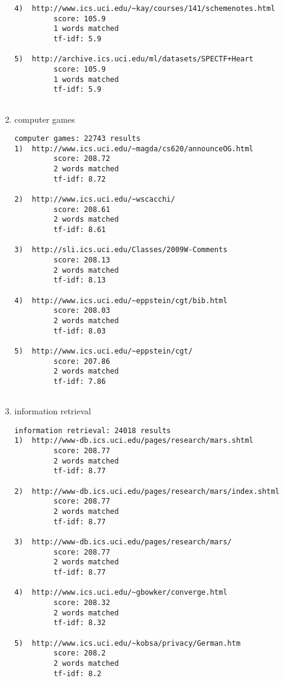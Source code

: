 \documentclass[paper=a4, fontsize=11pt]{scrartcl} %
\numberwithin{equation}{section} %
\numberwithin{table}{section} %
\begin{document}
\begin{enumerate}
\begin{small}
\begin{verbatim}
4)  http://www.ics.uci.edu/~kay/courses/141/schemenotes.html 
         score: 105.9 
         1 words matched 
         tf-idf: 5.9

5)  http://archive.ics.uci.edu/ml/datasets/SPECTF+Heart 
         score: 105.9 
         1 words matched 
         tf-idf: 5.9


\end{verbatim}
\end{small}

\item computer games
\begin{small}
\begin{verbatim}
computer games: 22743 results
1)  http://www.ics.uci.edu/~magda/cs620/announceOG.html 
         score: 208.72 
         2 words matched 
         tf-idf: 8.72

2)  http://www.ics.uci.edu/~wscacchi/ 
         score: 208.61 
         2 words matched 
         tf-idf: 8.61

3)  http://sli.ics.uci.edu/Classes/2009W-Comments 
         score: 208.13 
         2 words matched 
         tf-idf: 8.13

4)  http://www.ics.uci.edu/~eppstein/cgt/bib.html 
         score: 208.03 
         2 words matched 
         tf-idf: 8.03

5)  http://www.ics.uci.edu/~eppstein/cgt/ 
         score: 207.86 
         2 words matched 
         tf-idf: 7.86


\end{verbatim}
\end{small}

\item information retrieval
\begin{small}
\begin{verbatim}
information retrieval: 24018 results
1)  http://www-db.ics.uci.edu/pages/research/mars.shtml 
         score: 208.77 
         2 words matched 
         tf-idf: 8.77

2)  http://www-db.ics.uci.edu/pages/research/mars/index.shtml 
         score: 208.77 
         2 words matched 
         tf-idf: 8.77

3)  http://www-db.ics.uci.edu/pages/research/mars/ 
         score: 208.77 
         2 words matched 
         tf-idf: 8.77

4)  http://www.ics.uci.edu/~gbowker/converge.html 
         score: 208.32 
         2 words matched 
         tf-idf: 8.32

5)  http://www.ics.uci.edu/~kobsa/privacy/German.htm 
         score: 208.2 
         2 words matched 
         tf-idf: 8.2


\end{verbatim}
\end{small}
\end{enumerate}
\newpage


\end{document}
